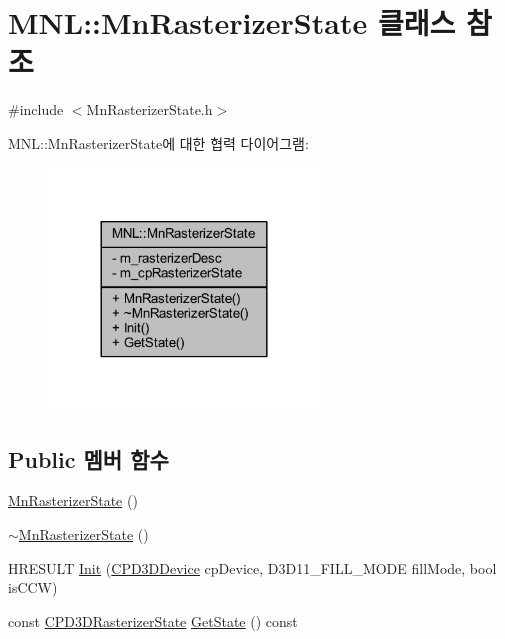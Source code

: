 \hypertarget{class_m_n_l_1_1_mn_rasterizer_state}{}\section{M\+NL\+:\+:Mn\+Rasterizer\+State 클래스 참조}
\label{class_m_n_l_1_1_mn_rasterizer_state}


{\ttfamily \#include $<$Mn\+Rasterizer\+State.\+h$>$}



M\+NL\+:\+:Mn\+Rasterizer\+State에 대한 협력 다이어그램\+:\nopagebreak
\begin{figure}[H]
\begin{center}
\leavevmode
\includegraphics[width=204pt]{class_m_n_l_1_1_mn_rasterizer_state__coll__graph}
\end{center}
\end{figure}
\subsection*{Public 멤버 함수}
\begin{DoxyCompactItemize}
\item 
\hyperlink{class_m_n_l_1_1_mn_rasterizer_state_ac6a6dde00f1bba11b762c0ff21b9598c}{Mn\+Rasterizer\+State} ()
\item 
\hyperlink{class_m_n_l_1_1_mn_rasterizer_state_a414bc5cdc7de69287821dd0ddd08ae52}{$\sim$\+Mn\+Rasterizer\+State} ()
\item 
H\+R\+E\+S\+U\+LT \hyperlink{class_m_n_l_1_1_mn_rasterizer_state_a543c1ca2173258a0af7bbf0cd0e16922}{Init} (\hyperlink{namespace_m_n_l_a1eec210db8f309a4a9ac0d9658784c31}{C\+P\+D3\+D\+Device} cp\+Device, D3\+D11\+\_\+\+F\+I\+L\+L\+\_\+\+M\+O\+DE fill\+Mode, bool is\+C\+CW)
\item 
const \hyperlink{namespace_m_n_l_aa6c2682c64c5b58c458c36bb424f1e56}{C\+P\+D3\+D\+Rasterizer\+State} \hyperlink{class_m_n_l_1_1_mn_rasterizer_state_a91cc6f6e2f11441d31ae75f2c9d65807}{Get\+State} () const
\end{DoxyCompactItemize}
